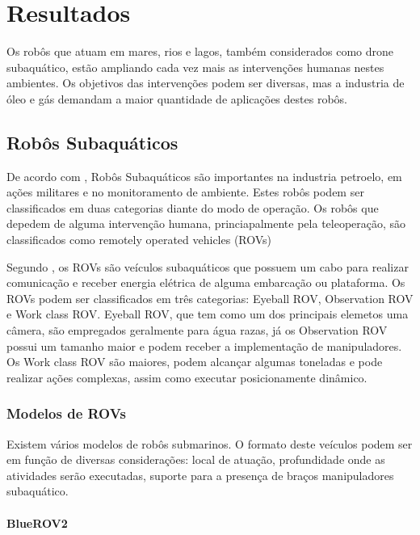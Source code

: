 \chapter{Resultados}
\label{chap:result}
Os robôs que atuam em mares, rios e lagos, também considerados como drone subaquático, estão ampliando cada vez mais as intervenções humanas nestes ambientes. Os objetivos das intervenções podem ser diversas, mas a industria de óleo e gás demandam a maior quantidade de aplicações destes robôs. 


\section{Robôs Subaquáticos}

\label{underwater_robots}
De acordo com \cite{Bogue1}, Robôs Subaquáticos são importantes na industria petroelo, em ações militares e no monitoramento de ambiente. Estes robôs podem ser classificados em duas categorias diante do modo de operação. Os robôs que depedem de alguma intervenção humana, princiapalmente pela teleoperação, são classificados como remotely operated vehicles (ROVs)

Segundo \cite{Towards}, os ROVs são veículos subaquáticos que possuem um cabo para realizar comunicação e receber energia elétrica de alguma embarcação ou plataforma. Os ROVs podem ser classificados em três categorias: Eyeball ROV, Observation ROV e Work class ROV. Eyeball ROV, que tem como um dos principais elemetos uma câmera, são empregados geralmente para água razas, já os Observation ROV possui um tamanho maior e podem receber a implementação de manipuladores. Os Work class ROV são maiores, podem alcançar algumas toneladas e pode realizar ações complexas, assim como executar posicionamente dinâmico.

\subsection{Modelos de ROVs}

Existem vários modelos de robôs submarinos. O formato deste veículos podem ser em função de diversas considerações: local de atuação, profundidade onde as atividades serão executadas, suporte para a presença de braços manipuladores subaquático.

\subsubsection{BlueROV2}


